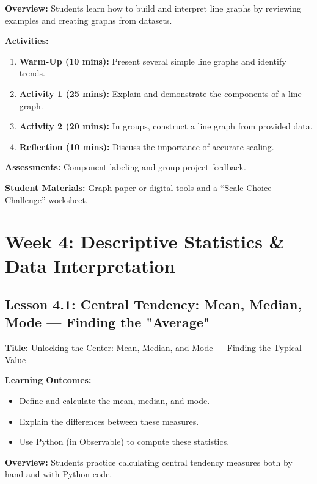 \documentclass{tufte-book}
\begin{document}
\medskip
\textbf{Overview:}  
Students learn how to build and interpret line graphs by reviewing examples and creating graphs from datasets.

\medskip
\textbf{Activities:}
\begin{enumerate}[label=\arabic*.]
    \item \textbf{Warm-Up (10 mins):} Present several simple line graphs and identify trends.
    \item \textbf{Activity 1 (25 mins):} Explain and demonstrate the components of a line graph.
    \item \textbf{Activity 2 (20 mins):} In groups, construct a line graph from provided data.
    \item \textbf{Reflection (10 mins):} Discuss the importance of accurate scaling.
\end{enumerate}

\medskip
\textbf{Assessments:}  
Component labeling and group project feedback.

\medskip
\textbf{Student Materials:}  
Graph paper or digital tools and a “Scale Choice Challenge” worksheet.

\section{Week 4: Descriptive Statistics \& Data Interpretation}

\subsection{Lesson 4.1: Central Tendency: Mean, Median, Mode --- Finding the "Average"}
\textbf{Title:} Unlocking the Center: Mean, Median, and Mode --- Finding the Typical Value

\medskip
\textbf{Learning Outcomes:}
\begin{itemize}[leftmargin=*, label={\textbullet}]
    \item Define and calculate the mean, median, and mode.
    \item Explain the differences between these measures.
    \item Use Python (in Observable) to compute these statistics.
\end{itemize}

\medskip
\textbf{Overview:}  
Students practice calculating central tendency measures both by hand and with Python code.
\end{document}
